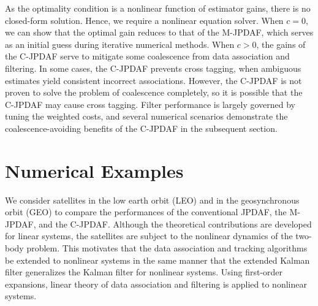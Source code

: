 As the optimality condition is a nonlinear function of estimator gains, there is no closed-form solution.
Hence, we require a nonlinear equation solver.
When $c=0$, we can show that the optimal gain reduces to that of the M-JPDAF, which serves as an initial guess during iterative numerical methods.
When $c>0$, the gains of the C-JPDAF serve to mitigate some coalescence from data association and filtering. In some cases, the C-JPDAF prevents cross tagging, when ambiguous estimates yield consistent incorrect associations. However, the C-JPDAF is not proven to solve the problem of coalescence completely, so it is possible that the C-JPDAF may cause cross tagging.
Filter performance is largely governed by tuning the weighted costs, and several numerical scenarios demonstrate the coalescence-avoiding benefits of the C-JPDAF in the subsequent section.%





\section{Numerical Examples}
\label{sec:NE}

We consider satellites in the low earth orbit (LEO) and in the geosynchronous orbit (GEO) to compare the performances of the conventional JPDAF, the M-JPDAF, and the C-JPDAF.
Although the theoretical contributions are developed for linear systems, the satellites are subject to the nonlinear dynamics of the two-body problem. This motivates that the data association and tracking algorithms be extended to nonlinear systems in the same manner that the extended Kalman filter generalizes the Kalman filter for nonlinear systems.
Using first-order expansions, linear theory of data association and filtering is applied to nonlinear systems.

